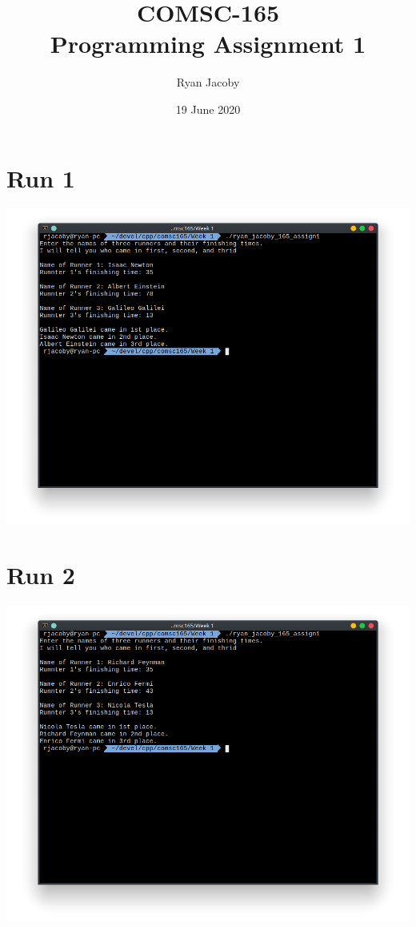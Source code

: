 \documentclass[letterpaper, 11pt]{article}
\title{COMSC-165 \\ Programming Assignment 1}
\author{Ryan Jacoby}
\date{19 June 2020}
\begin{document}
\maketitle

\section*{Run 1}
\includegraphics[scale=0.5]{run1.png}

\section*{Run 2}
\includegraphics[scale=0.5]{run2.png}
\end{document}
